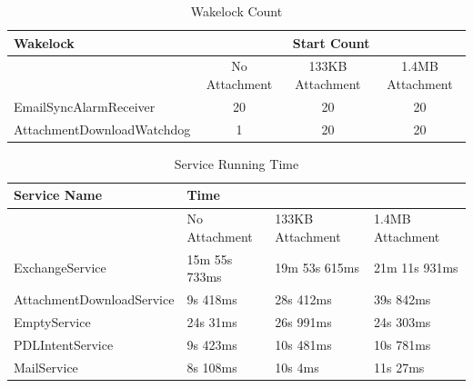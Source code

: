 \documentclass[a4paper,12pt]{article}
\begin{document}
\begin{table}[!h]
\centering
\caption{Wakelock Count}
\label{my-label}
\begin{tabular}{|l|c|c|c|}
\hline
Wakelock                            & \multicolumn{3}{c|}{Start Count}                    \\ \hline
                                    & No Attachment & 133KB Attachment & 1.4MB Attachment \\ \hline
EmailSyncAlarmReceiver              & 20            & 20               & 20               \\ \hline
AttachmentDownloadWatchdog & 1             & 20               & 20               \\ \hline
\end{tabular}
\end{table}
\begin{table}[!h]
\centering
\caption{Service Running Time}
\label{my-label}
\begin{tabular}{|l|l|l|l|}
\hline
Service Name              & \multicolumn{3}{P{10cm}|}{Time}                           \\ \hline
                          & No Attachment & 133KB Attachment & 1.4MB Attachment \\ \hline
ExchangeService           & 15m 55s 733ms & 19m 53s 615ms    & 21m 11s 931ms     \\ \hline
AttachmentDownloadService & 9s 418ms      & 28s 412ms        & 39s 842ms        \\ \hline
EmptyService              & 24s 31ms      & 26s 991ms          & 24s 303ms         \\ \hline
PDLIntentService          & 9s 423ms      & 10s 481ms         & 10s 781ms         \\ \hline
MailService               & 8s 108ms      & 10s 4ms         & 11s 27ms         \\ \hline
\end{tabular}
\end{table}
\end{document}

